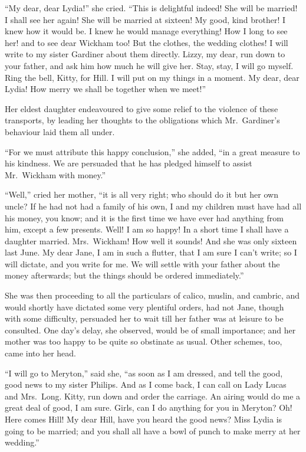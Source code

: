 ``My dear, dear Lydia!'' she cried.  ``This is delightful indeed!
She will be married!  I shall see her again!  She will be married
at sixteen!  My good, kind brother!  I knew how it would be.  I
knew he would manage everything!  How I long to see her!  and
to see dear Wickham too!  But the clothes, the wedding clothes!
I will write to my sister Gardiner about them directly.  Lizzy,
my dear, run down to your father, and ask him how much he will
give her.  Stay, stay, I will go myself.  Ring the bell, Kitty, for
Hill.  I will put on my things in a moment.  My dear, dear Lydia!
How merry we shall be together when we meet!''

Her eldest daughter endeavoured to give some relief to the
violence of these transports, by leading her thoughts to the
obligations which Mr.\ Gardiner's behaviour laid them all under.

``For we must attribute this happy conclusion,'' she added, ``in a
great measure to his kindness.  We are persuaded that he has
pledged himself to assist Mr.\ Wickham with money.''

``Well,'' cried her mother, ``it is all very right; who should do it
but her own uncle?  If he had not had a family of his own, I and
my children must have had all his money, you know; and it is the
first time we have ever had anything from him, except a few
presents.  Well!  I am so happy!  In a short time I shall have
a daughter married.  Mrs.\ Wickham!  How well it sounds!  And
she was only sixteen last June.  My dear Jane, I am in such a
flutter, that I am sure I can't write; so I will dictate, and you
write for me.  We will settle with your father about the money
afterwards; but the things should be ordered immediately.''

She was then proceeding to all the particulars of calico,
muslin, and cambric, and would shortly have dictated some very
plentiful orders, had not Jane, though with some difficulty,
persuaded her to wait till her father was at leisure to be
consulted.  One day's delay, she observed, would be of small
importance; and her mother was too happy to be quite so
obstinate as usual.  Other schemes, too, came into her head.

``I will go to Meryton,'' said she, ``as soon as I am dressed, and
tell the good, good news to my sister Philips.  And as I come
back, I can call on Lady Lucas and Mrs.\ Long.  Kitty, run down
and order the carriage.  An airing would do me a great deal of
good, I am sure.  Girls, can I do anything for you in Meryton?
Oh!  Here comes Hill!  My dear Hill, have you heard the good
news?  Miss Lydia is going to be married; and you shall all have
a bowl of punch to make merry at her wedding.''

